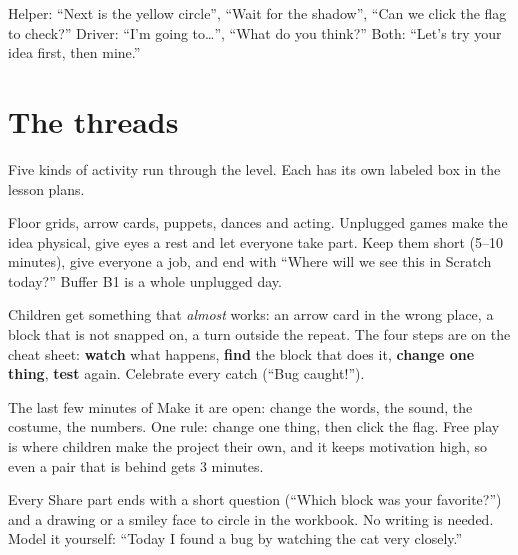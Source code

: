 \documentclass[track=junior,level=1,teacher]{kidscode}
\begin{document}
\begin{tip}
Helper: \enquote{Next is the yellow circle}, \enquote{Wait for the shadow}, \enquote{Can we click the flag to check?}
Driver: \enquote{I'm going to\dots}, \enquote{What do you think?}
Both: \enquote{Let's try your idea first, then mine.}
\end{tip}

\section{The threads}
Five kinds of activity run through the level. Each has its own labeled box in the lesson plans.

\begin{unplugged}[No computer]
Floor grids, arrow cards, puppets, dances and acting. Unplugged games make the idea physical, give
eyes a rest and let everyone take part. Keep them short (5--10 minutes), give everyone a job,
and end with \enquote{Where will we see this in Scratch today?} Buffer B1 is a whole unplugged day.
\end{unplugged}

\begin{bughunt}
Children get something that \emph{almost} works: an arrow card in the wrong place, a block that is
not snapped on, a turn outside the repeat. The four steps are on the cheat sheet:
\textbf{watch} what happens, \textbf{find} the block that does it, \textbf{change one thing},
\textbf{test} again. Celebrate every catch (\enquote{Bug caught!}).
\end{bughunt}

\begin{freebuild}
The last few minutes of Make it are open: change the words, the sound, the costume, the numbers.
One rule: change one thing, then click the flag. Free play is where children make the project
their own, and it keeps motivation high, so even a pair that is behind gets 3 minutes.
\end{freebuild}

\begin{reflection}
Every Share part ends with a short question (\enquote{Which block was your favorite?}) and a
drawing or a smiley face to circle in the workbook. No writing is needed. Model it yourself:
\enquote{Today I found a bug by watching the cat very closely.}
\end{reflection}
\end{document}
